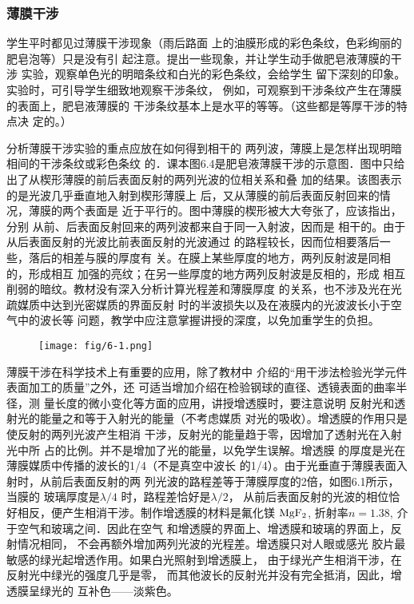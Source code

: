 \subsubsection{薄膜干涉 }
学生平时都见过薄膜干涉现象（雨后路面
上的油膜形成的彩色条纹，色彩绚丽的肥皂泡等）只是没有引
起注意。提出一些现象，并让学生动手做肥皂液薄膜的干涉
实验，观察单色光的明暗条纹和白光的彩色条纹，会给学生
留下深刻的印象。实验时，可引导学生细致地观察干涉条纹，
例如，可观察到干涉条纹产生在薄膜的表面上，肥皂液薄膜的
干涉条纹基本上是水平的等等。（这些都是等厚干涉的特点决
定的。）

分析薄膜干涉实验的重点应放在如何得到相干的
两列波，薄膜上是怎样出现明暗相间的干涉条纹或彩色条纹
的．课本图6.4是肥皂液薄膜干涉的示意图．图中只给
出了从楔形薄膜的前后表面反射的两列光波的位相关系和叠
加的结果。该图表示的是光波几乎垂直地入射到楔形薄膜上
后，又从薄膜的前后表面反射回来的情况，薄膜的两个表面是
近于平行的。图中薄膜的楔形被大大夸张了，应该指出，分别
从前、后表面反射回来的两列波都来自于同一入射波，因而是
相干的。由于从后表面反射的光波比前表面反射的光波通过
的路程较长，因而位相要落后一些，落后的相差与膜的厚度有
关。在膜上某些厚度的地方，两列反射波是同相的，形成相互
加强的亮纹；在另一些厚度的地方两列反射波是反相的，形成
相互削弱的暗纹。教材没有深入分析计算光程差和薄膜厚度
的关系，也不涉及光在光疏媒质中达到光密媒质的界面反射
时的半波损失以及在液膜内的光波波长小于空气中的波长等
问题，教学中应注意掌握讲授的深度，以免加重学生的负担。

\begin{figure}[htp]
    \centering
    \texttt{[image: fig/6-1.png]}
    \caption{}
\end{figure}


薄膜干涉在科学技术上有重要的应用，除了教材中
介绍的“用干涉法检验光学元件表面加工的质量”之外，还
可适当增加介绍在检验钢球的直径、透镜表面的曲率半径，测
量长度的微小变化等方面的应用，讲授增透膜时，要注意说明
反射光和透射光的能量之和等于入射光的能量（不考虑媒质
对光的吸收）。增透膜的作用只是使反射的两列光波产生相消
干涉，反射光的能量趋于零，因增加了透射光在入射光中所
占的比例。并不是增加了光的能量，以免学生误解。增透膜
的厚度是光在薄膜媒质中传播的波长的1/4（不是真空中波长
的1/4）。由于光垂直于薄膜表面入射时，从前后表面反射的两
列光波的路程差等于薄膜厚度的2倍，如图6.1所示，当膜的
玻璃厚度是$\lambda/4$
时，路程差恰好是$\lambda/2$，
从前后表面反射的光波的相位恰好相反，便产生相消干涉。制作增透膜的材料是氟化镁
${\rm MgF_2}$, 折射率$n=1.38$, 介于空气和玻璃之间．因此在空气
和增透膜的界面上、增透膜和玻璃的界面上，反射情况相同，
不会再额外增加两列光波的光程差。增透膜只对人眼或感光
胶片最敏感的绿光起增透作用。如果白光照射到增透膜上，
由于绿光产生相消干涉，在反射光中绿光的强度几乎是零，
而其他波长的反射光并没有完全抵消，因此，增透膜呈绿光的
互补色——淡紫色。

